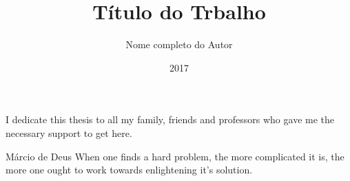 \documentclass[pt,twoside,onehalfspacing,bsc]{ifbthesis}
\title{Título do Trbalho }
\date{2017}
\author{Nome completo do Autor}
\begin{document}
\frontmatter

\frontpage

\presentationpage

\begin{fichacatalografica}
	\FakeFichaCatalografica %
\end{fichacatalografica}

\banca

\begin{dedicatory}
I dedicate this thesis to all my family, friends and professors who gave me the
necessary support to get here.
\end{dedicatory}

\acknowledgements


\begin{epigraph}[]{Márcio de Deus}
When one finds a hard problem, the more complicated it is, the more one ought to work towards enlightening it's solution.
\end{epigraph}

\resumo
{\parindent0pt
	
}

\abstract
{\parindent0pt
	
}

\listoffigures

\lstlistoflistings

\listoftables

\listofacronyms


\tableofcontents

\mainmatter







\begin{references}
  
\end{references}


\theappendix

\end{document}

